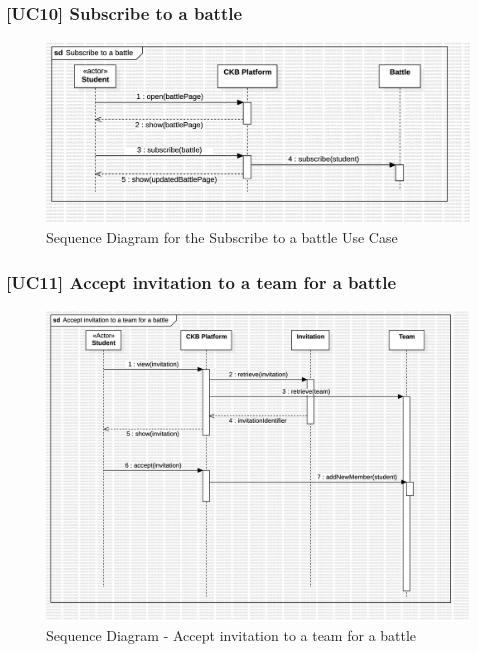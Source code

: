 \subsubsection*{[UC10] Subscribe to a battle}
\begin{figure}[H]
    \centering
    \includegraphics[width=\textwidth]{Diagrams/UC10SequenceDiagram.jpg}
    \caption{Sequence Diagram for the Subscribe to a battle Use Case}
    \label{fig:sequence-diagram-subscribe-battle}
\end{figure}

\subsubsection*{[UC11] Accept invitation to a team for a battle}
\begin{figure}[H]
    \centering
    \includegraphics[width=\textwidth]{Diagrams/StudentAcceptInvitation.jpg}
    \caption{Sequence Diagram - Accept invitation to a team for a battle}
    \label{fig:sequence-diagram-accept-invitation}
\end{figure}


